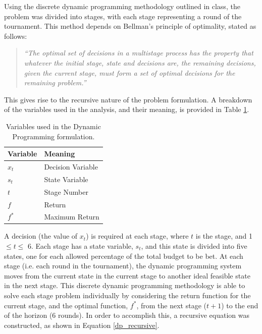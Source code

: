 \documentclass[12pt]{article}
\begin{document}
Using the discrete dynamic programming methodology outlined in class, the problem was divided into stages, with each stage representing a round of the tournament.
This method depends on Bellman's principle of optimality, stated as follows:
\begin{quote}
\emph{``The optimal set of decisions in a multistage process has the property that whatever the initial stage, state and decisions are, the remaining decisions, given the current stage, must form a set of optimal decisions for the remaining problem.''}
\end{quote}
This gives rise to the recursive nature of the problem formulation.
A breakdown of the variables used in the analysis, and their meaning, is provided in Table \ref{dp_vars}. \\

\begin{table}[htbp!]
\begin{centering}
    \begin{tabular}{|l|l|}
    \hline
    Variable & Meaning           \\ \hline
    $x_{t}$        & Decision Variable \\ \hline
    $s_{t}$        & State Variable    \\ \hline
    $t$        & Stage Number             \\ \hline
    $f$        & Return            \\ \hline
    $f^{*}$       & Maximum Return    \\ \hline
    \end{tabular}
    \label{dp_vars}
    \caption{Variables used in the Dynamic Programming formulation.}
\end{centering}
\end{table}

A decision (the value of $x_{t}$) is required at each stage, where $t$ is the stage, and 1 $\le t \le$ 6.
Each stage has a state variable, $s_{t}$, and this state is divided into five states, one for each allowed percentage of the total budget to be bet.
At each stage (i.e. each round in the tournament), the dynamic programming system moves from the current state in the current stage to another ideal feasible state in the next stage.
This discrete dynamic programming methodology is able to solve each stage problem individually by considering the return function for the current stage, and the optimal function, $f^{*}$, from the next stage ($t + 1$) to the end of the horizon (6 rounds).
In order to accomplish this, a recursive equation was constructed, as shown in Equation \ref{dp_recursive}.
\end{document}
